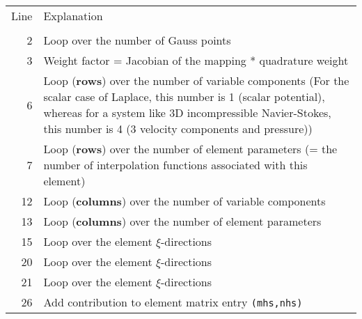 \begin{tabular}{|rp{}|}
  \hline
  Line & Explanation \\
  & \\
  2 & Loop over the number of Gauss points\\
  3 & Weight factor = Jacobian of the mapping * quadrature weight\\
  6 & Loop ({\bf rows}) over the number of variable components 
      (For the scalar case of Laplace, this number is 1 (scalar potential),
      whereas for a system like 3D incompressible Navier-Stokes, 
      this number is 4 (3 velocity components and pressure))\\
  7 & Loop ({\bf rows}) over the number of element parameters (= the number of interpolation functions 
      associated with this element) \\
  12 & Loop ({\bf columns}) over the number of variable components\\ 
  13 & Loop ({\bf columns}) over the number of element parameters\\
  15 & Loop over the element $\xi$-directions\\
  20 & Loop over the element $\xi$-directions\\
  21 & Loop over the element $\xi$-directions\\
  26 & Add contribution to element matrix entry {\tt (mhs,nhs)}\\
  \hline
\end{tabular}


